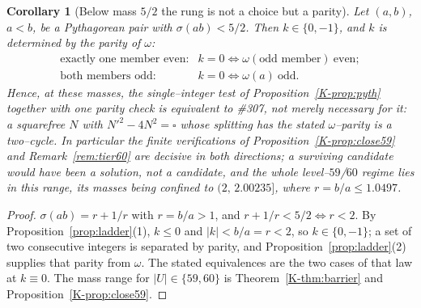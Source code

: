 \documentclass[11pt]{article}
\newtheorem{corollary}[theorem]{Corollary}
\theoremstyle{definition}
\begin{document}
\begin{corollary}[Below mass $5/2$ the rung is not a choice but a parity]\label{cor:kdetermined}
Let $(a,b)$, $a<b$, be a Pythagorean pair with $\sigma(ab)<5/2$. Then $k\in\{0,-1\}$, and $k$ is
\emph{determined} by the parity of $\omega$:
\[
\begin{array}{ll}
\text{exactly one member even:} & k=0\iff\omega(\text{odd member})\ \text{even};\\
\text{both members odd:}        & k=0\iff\omega(a)\ \text{odd}.
\end{array}
\]
Hence, at these masses, the single--integer test of Proposition~\ref{K-prop:pyth} together with one
parity check is \emph{equivalent} to \#307, not merely necessary for it: a squarefree $N$ with
$N'^2-4N^2=\square$ whose splitting has the stated $\omega$--parity \emph{is} a two--cycle. In
particular the finite verifications of Proposition~\ref{K-prop:close59} and Remark~\ref{rem:tier60} are
decisive in both directions; a surviving candidate would have been a solution, not a candidate,
and the whole level--$59$/$60$ regime lies in this range, its masses being confined to
$(2,\,2.00235]$, where $r=b/a\le1.0497$.
\end{corollary}
\begin{proof}
$\sigma(ab)=r+1/r$ with $r=b/a>1$, and $r+1/r<5/2\iff r<2$. By
Proposition~\ref{prop:ladder}(1), $k\le0$ and $|k|<b/a=r<2$, so $k\in\{0,-1\}$; a set of two
consecutive integers is separated by parity, and Proposition~\ref{prop:ladder}(2) supplies that
parity from $\omega$. The stated equivalences are the two cases of that law at $k\equiv0$. The
mass range for $|U|\in\{59,60\}$ is Theorem~\ref{K-thm:barrier} and Proposition~\ref{K-prop:close59}.
\end{proof}
\end{document}
